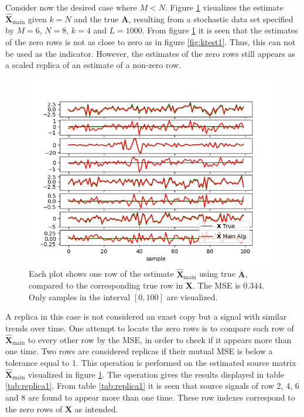 \noindent
Consider now the desired case where $M < N$.
Figure \ref{fig:ktest3} visualizes the estimate $\hat{\mathbf{X}}_{\text{main}}$ given $k=N$ and the true $\textbf{A}$, resulting from a stochastic data set specified by $M = 6$, $N = 8$, $k = 4$ and $L = 1000$.
From figure \ref{fig:ktest3} it is seen that the estimates of the zero rows is not as close to zero as in figure \ref{fig:ktest1}. 
Thus, this can not be used as the indicator. 
However, the estimates of the zero rows still appears as a scaled replica of an estimate of a non-zero row. 
\begin{figure}[H]
	\centering
	\includegraphics[scale=0.5]{figures/ch_estimate/k_test3.png}
	\caption{Each plot shows one row of the estimate $\hat{\mathbf{X}}_{\text{main}}$ using true $\mathbf{A}$, compared to the corresponding true row in $\mathbf{X}$. The MSE is $0.344$. Only samples in the interval $[0,100]$ are visualized.}
	\label{fig:ktest3}
\end{figure}
\noindent
A replica in this case is not considered an exact copy but a signal with similar trends over time.
One attempt to locate the zero rows is to compare each row of $\hat{\mathbf{X}}_{\text{main}}$ to every other row by the MSE, in order to check if it appears more than one time.
Two rows are considered replicas if their mutual MSE is below a tolerance equal to 1. 
This operation is performed on the estimated source matrix $\hat{\mathbf{X}}_{\text{main}}$ visualized in figure \ref{fig:ktest3}.
The operation gives the results displayed in table \ref{tab:replica1}.
From table \ref{tab:replica1} it is seen that source signals of row 2, 4, 6 and 8 are found to appear more than one time. These row indexes correspond to the zero rows of $\mathbf{X}$ as intended. 
